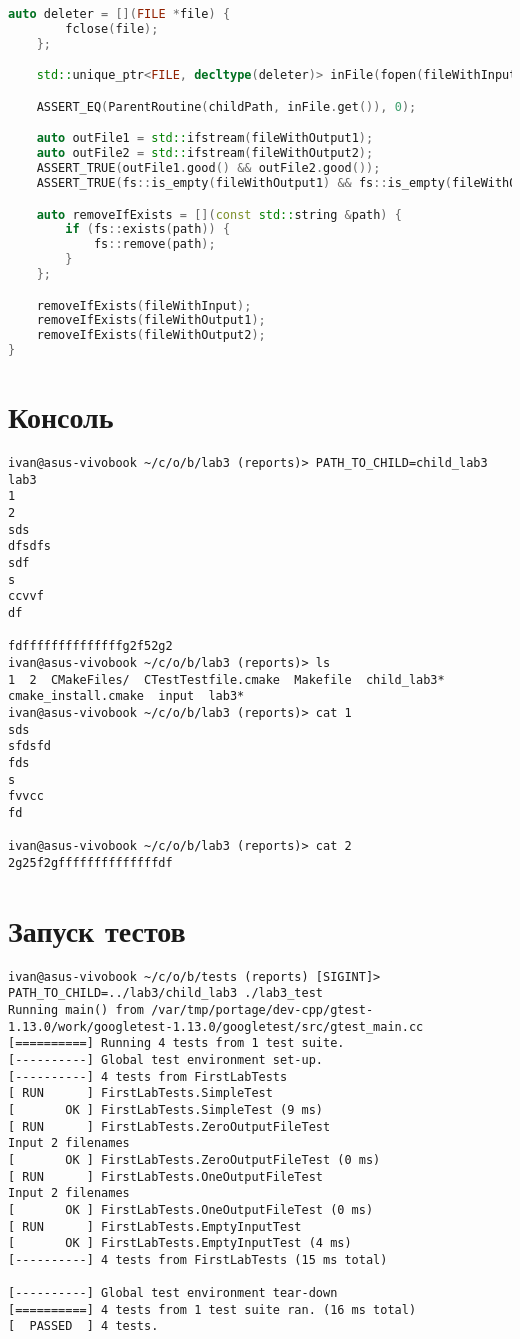 \documentclass[a4paper, 12pt]{article}
\begin{document}
\begin{lstlisting}[language=C++]
    auto deleter = [](FILE *file) {
        fclose(file);
    };

    std::unique_ptr<FILE, decltype(deleter)> inFile(fopen(fileWithInput.c_str(), "r"), deleter);

    ASSERT_EQ(ParentRoutine(childPath, inFile.get()), 0);

    auto outFile1 = std::ifstream(fileWithOutput1);
    auto outFile2 = std::ifstream(fileWithOutput2);
    ASSERT_TRUE(outFile1.good() && outFile2.good());
    ASSERT_TRUE(fs::is_empty(fileWithOutput1) && fs::is_empty(fileWithOutput2));

    auto removeIfExists = [](const std::string &path) {
        if (fs::exists(path)) {
            fs::remove(path);
        }
    };

    removeIfExists(fileWithInput);
    removeIfExists(fileWithOutput1);
    removeIfExists(fileWithOutput2);
}
\end{lstlisting}
\newpage

\section{Консоль}
\begin{verbatim}
ivan@asus-vivobook ~/c/o/b/lab3 (reports)> PATH_TO_CHILD=child_lab3 lab3
1
2
sds
dfsdfs
sdf
s
ccvvf
df

fdffffffffffffffg2f52g2
ivan@asus-vivobook ~/c/o/b/lab3 (reports)> ls
1  2  CMakeFiles/  CTestTestfile.cmake  Makefile  child_lab3*  cmake_install.cmake  input  lab3*
ivan@asus-vivobook ~/c/o/b/lab3 (reports)> cat 1 
sds
sfdsfd
fds
s
fvvcc
fd

ivan@asus-vivobook ~/c/o/b/lab3 (reports)> cat 2
2g25f2gffffffffffffffdf
\end{verbatim}

\section{Запуск тестов}
\begin{verbatim}
ivan@asus-vivobook ~/c/o/b/tests (reports) [SIGINT]> PATH_TO_CHILD=../lab3/child_lab3 ./lab3_test
Running main() from /var/tmp/portage/dev-cpp/gtest-1.13.0/work/googletest-1.13.0/googletest/src/gtest_main.cc
[==========] Running 4 tests from 1 test suite.
[----------] Global test environment set-up.
[----------] 4 tests from FirstLabTests
[ RUN      ] FirstLabTests.SimpleTest
[       OK ] FirstLabTests.SimpleTest (9 ms)
[ RUN      ] FirstLabTests.ZeroOutputFileTest
Input 2 filenames
[       OK ] FirstLabTests.ZeroOutputFileTest (0 ms)
[ RUN      ] FirstLabTests.OneOutputFileTest
Input 2 filenames
[       OK ] FirstLabTests.OneOutputFileTest (0 ms)
[ RUN      ] FirstLabTests.EmptyInputTest
[       OK ] FirstLabTests.EmptyInputTest (4 ms)
[----------] 4 tests from FirstLabTests (15 ms total)

[----------] Global test environment tear-down
[==========] 4 tests from 1 test suite ran. (16 ms total)
[  PASSED  ] 4 tests.
\end{verbatim}
\newpage
\end{document}
